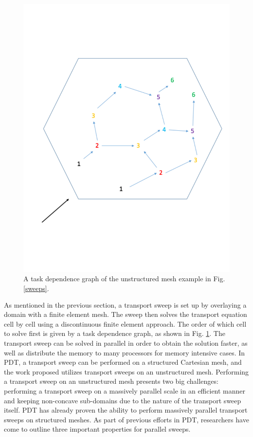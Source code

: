 \documentclass{anstrans}
\begin{document}
\begin{figure}
\centering
\includegraphics[scale = 0.4,trim = 0cm 3.5cm 0cm 3cm,clip]{figures/tdg.pdf}
\caption{A task dependence graph of the unstructured mesh example in Fig. \ref{sweeps}.}
\label{tdg}
\end{figure}

As mentioned in the previous section, a transport sweep is set up by overlaying a domain with a finite element mesh. The sweep then solves the transport equation cell by cell using a discontinuous finite element approach. The order of which cell to solve first is given by a task dependence graph, as shown in Fig. \ref{tdg}. The transport sweep can be solved in parallel in order to obtain the solution faster, as well as distribute the memory to many processors for memory intensive cases. In PDT, a transport sweep can be performed on a structured Cartesian mesh, and the work proposed utilizes transport sweeps on an unstructured mesh. Performing a transport sweep on an unstructured mesh presents two big challenges: performing a transport sweep on a massively parallel scale in an efficient manner and keeping non-concave sub-domains due to the nature of the transport sweep itself. PDT has already proven the ability to perform massively parallel transport sweeps on structured meshes. As part of previous efforts in PDT, researchers have come to outline three important properties for parallel sweeps. 
\end{document}
